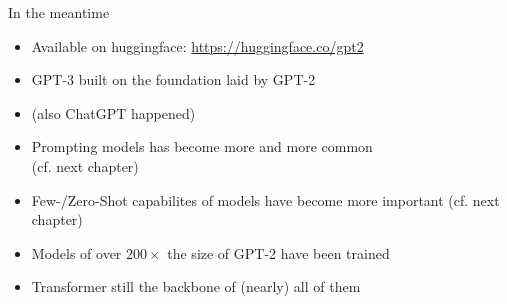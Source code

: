
\begin{frame}{In the meantime}

\vfill

\begin{itemize}
	\item Available on huggingface: \url{https://huggingface.co/gpt2}
	\item GPT-3 built on the foundation laid by GPT-2
	\item (also ChatGPT happened)
	\item Prompting models has become more and more common\\ (cf. next chapter)
	\item Few-/Zero-Shot capabilites of models have become more important (cf. next chapter)
	\item Models of over $200\times$ the size of GPT-2 have been trained
	\item Transformer still the backbone of (nearly) all of them
\end{itemize}

\vfill

\end{frame}


\endlecture

